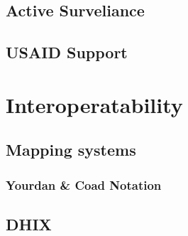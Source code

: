 \section{Active Surveliance}
\section{USAID Support}
\chapter{Interoperatability}
\section{Mapping systems}
\subsection{Yourdan \& Coad Notation}
\section{DHIX}

